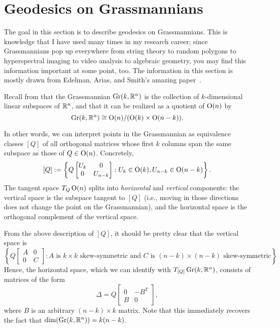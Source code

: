 
\section{Geodesics on Grassmannians}
\label{sec:geodesics on grassmannians}

The goal in this section is to describe geodesics on Grassmannians. This is knowledge that I have used many times in my research career; since Grassmannians pop up everywhere from string theory to random polygons to hyperspectral imaging to video analysis to algebraic geometry, you may find this information important at some point, too. The information in this section is mostly drawn from Edelman, Arias, and Smith's amazing paper~\cite{edelmanGeometryAlgorithmsOrthogonality1999}.

Recall from  that the Grassmannian $\operatorname{Gr}(k,\mathbb{R}^n)$ is the collection of $k$-dimensional linear subspaces of $\mathbb{R}^n$, and that it can be realized as a quotient of $\operatorname{O}(n)$ by
\[
	\operatorname{Gr}(k,\mathbb{R}^n) \cong \operatorname{O}(n)/(\operatorname{O}(k) \times \operatorname{O}(n-k)).
\]

In other words, we can interpret points in the Grassmannian as equivalence classes $[Q]$ of all orthogonal matrices whose first $k$ columns span the same subspace as those of $Q \in \operatorname{O}(n)$. Concretely,
\[
	[Q] := \left\{ Q \begin{bmatrix} U_k & 0 \\ 0 & U_{n-k} \end{bmatrix} : U_k \in \operatorname{O}(k), U_{n-k} \in \operatorname{O}(n-k) \right\}.
\]
The tangent space $T_Q \operatorname{O}(n)$ splits into \emph{horizontal} and \emph{vertical} components: the vertical space is the subspace tangent to $[Q]$ (i.e., moving in those directions does not change the point on the Grassmannian), and the horizontal space is the orthogonal complement of the vertical space.

From the above description of $[Q]$, it should be pretty clear that the vertical space is
\[
	\left\{Q\begin{bmatrix} A & 0 \\ 0 & C \end{bmatrix} : A \text{ is $k \times k$ skew-symmetric and $C$ is $(n-k) \times (n-k)$ skew-symmetric}\right\}.
\] 
Hence, the horizontal space, which we can identify with $T_{[Q]} \operatorname{Gr}(k,\mathbb{R}^n)$, consists of matrices of the form
\[
	\Delta = Q \begin{bmatrix} 0 & -B^T \\ B & 0 \end{bmatrix},
\]
where $B$ is an arbitrary $(n-k) \times k$ matrix. Note that this immediately recovers the fact that $\dim(\operatorname{Gr}(k,\mathbb{R}^n)) = k(n-k)$.

